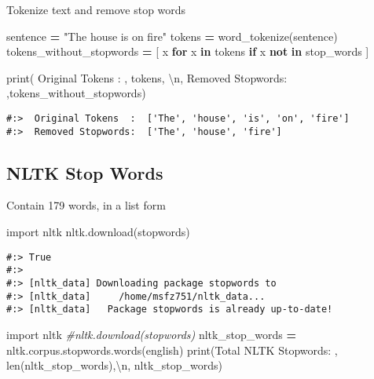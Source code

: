 \documentclass[
]{book}
\newenvironment{Shaded}{\begin{snugshade}}{\end{snugshade}}
\newcommand{\BuiltInTok}[1]{#1}
\newcommand{\CharTok}[1]{\textcolor[rgb]{0.5,0.5,0.5}{#1}}
\newcommand{\CommentTok}[1]{\textcolor[rgb]{0.37,0.37,0.37}{\textit{#1}}}
\newcommand{\ControlFlowTok}[1]{\textcolor[rgb]{0.27,0.27,0.27}{\textbf{#1}}}
\newcommand{\ImportTok}[1]{#1}
\newcommand{\KeywordTok}[1]{\textcolor[rgb]{0.27,0.27,0.27}{\textbf{#1}}}
\newcommand{\NormalTok}[1]{#1}
\newcommand{\OperatorTok}[1]{\textcolor[rgb]{0.43,0.43,0.43}{\textbf{#1}}}
\newcommand{\StringTok}[1]{\textcolor[rgb]{0.5,0.5,0.5}{#1}}
\begin{document}
Tokenize text and remove stop words

\begin{Shaded}
\begin{Highlighting}[]
\NormalTok{sentence }\OperatorTok{=} \StringTok{"The house is on fire"}
\NormalTok{tokens   }\OperatorTok{=}\NormalTok{ word\_tokenize(sentence)}
\NormalTok{tokens\_without\_stopwords }\OperatorTok{=}\NormalTok{ [ x }\ControlFlowTok{for}\NormalTok{ x }\KeywordTok{in}\NormalTok{ tokens }\ControlFlowTok{if}\NormalTok{ x }\KeywordTok{not} \KeywordTok{in}\NormalTok{ stop\_words ]}

\BuiltInTok{print}\NormalTok{(}\StringTok{\textquotesingle{} Original Tokens  : \textquotesingle{}}\NormalTok{, tokens, }\StringTok{\textquotesingle{}}\CharTok{\textbackslash{}n}\StringTok{\textquotesingle{}}\NormalTok{,}
      \StringTok{\textquotesingle{}Removed Stopwords: \textquotesingle{}}\NormalTok{,tokens\_without\_stopwords)}
\end{Highlighting}
\end{Shaded}

\begin{verbatim}
#:>  Original Tokens  :  ['The', 'house', 'is', 'on', 'fire'] 
#:>  Removed Stopwords:  ['The', 'house', 'fire']
\end{verbatim}

\hypertarget{nltk-stop-words}{%
\subsection{NLTK Stop Words}\label{nltk-stop-words}}

Contain 179 words, in a list form

\begin{Shaded}
\begin{Highlighting}[]
\ImportTok{import}\NormalTok{ nltk}
\NormalTok{nltk.download(}\StringTok{\textquotesingle{}stopwords\textquotesingle{}}\NormalTok{)}
\end{Highlighting}
\end{Shaded}

\begin{verbatim}
#:> True
#:> 
#:> [nltk_data] Downloading package stopwords to
#:> [nltk_data]     /home/msfz751/nltk_data...
#:> [nltk_data]   Package stopwords is already up-to-date!
\end{verbatim}

\begin{Shaded}
\begin{Highlighting}[]
\ImportTok{import}\NormalTok{ nltk}
\CommentTok{\#nltk.download(\textquotesingle{}stopwords\textquotesingle{})}
\NormalTok{nltk\_stop\_words }\OperatorTok{=}\NormalTok{ nltk.corpus.stopwords.words(}\StringTok{\textquotesingle{}english\textquotesingle{}}\NormalTok{)}
\BuiltInTok{print}\NormalTok{(}\StringTok{\textquotesingle{}Total NLTK Stopwords: \textquotesingle{}}\NormalTok{, }\BuiltInTok{len}\NormalTok{(nltk\_stop\_words),}\StringTok{\textquotesingle{}}\CharTok{\textbackslash{}n}\StringTok{\textquotesingle{}}\NormalTok{,}
\NormalTok{      nltk\_stop\_words)}
\end{Highlighting}
\end{Shaded}
\end{document}
